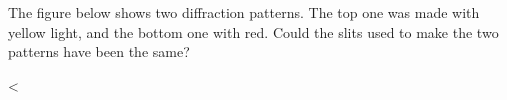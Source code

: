The figure below shows two diffraction patterns. The top
one was made with yellow light, and the bottom one with red.
Could the slits used to make the two patterns have been the same?

<%
